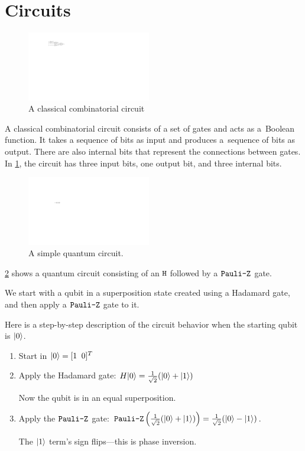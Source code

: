 \section{Circuits} 


\begin{figure}
\includegraphics[width=0.48\textwidth]{Figures/HWCircuits/DigitalCircuit} 
\caption{A classical combinatorial circuit}
\label{classicalcirc:fig}
\end{figure}
A classical combinatorial circuit consists of a set of gates and acts as a~Boolean function. It takes a sequence of bits as input and produces a~sequence of bits as output. There are also internal bits that represent the connections between gates. In \cref{classicalcirc:fig}, the circuit has three input bits, one output bit, and three internal bits.


\begin{figure}
\includegraphics[width=0.48\textwidth]{Figures/Circuits/HZ} 
\caption{A simple quantum circuit.}
\label{HZ:fig}
\end{figure}

\cref{HZ:fig} shows a quantum circuit consisting of an $\mathtt{H}$ followed by a $\texttt{Pauli-Z}$ gate.


We start with a qubit in a superposition state created using a Hadamard gate, and then apply a $\texttt{Pauli-Z}$ gate to it.

Here is a step-by-step description of the circuit behavior when the starting qubit is $|0\rangle$.

\begin{enumerate}
\item Start in $|0\rangle = [1 \;\; 0]^T$
\item Apply the Hadamard gate: 
$H|0\rangle = \frac{1}{\sqrt{2}}(|0\rangle + |1\rangle)$

Now the qubit is in an equal superposition.
\item Apply the $\texttt{Pauli-Z}$ gate: 
$\texttt{Pauli-Z}\left(\frac{1}{\sqrt{2}}(|0\rangle + |1\rangle)\right) = \frac{1}{\sqrt{2}}(|0\rangle - |1\rangle)$.

The $|1\rangle$ term’s sign flips—this is phase inversion.
\end{enumerate}

